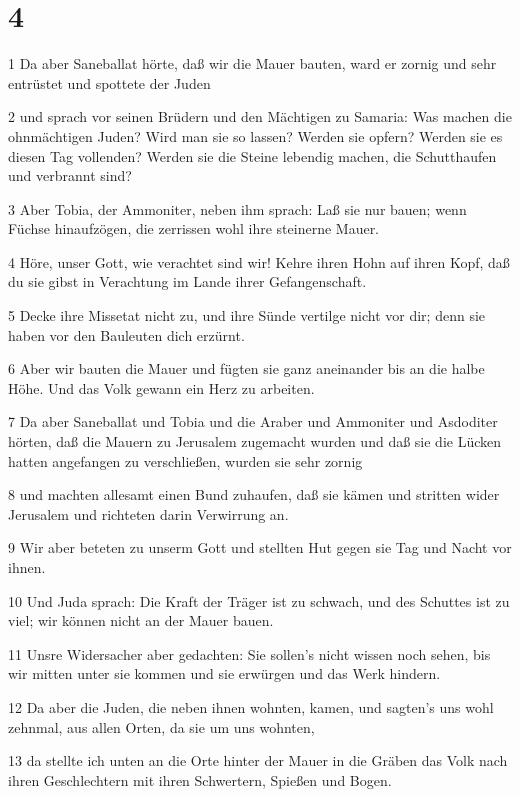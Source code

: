 \chapter{4}

\par 1 Da aber Saneballat hörte, daß wir die Mauer bauten, ward er zornig und sehr entrüstet und spottete der Juden
\par 2 und sprach vor seinen Brüdern und den Mächtigen zu Samaria: Was machen die ohnmächtigen Juden? Wird man sie so lassen? Werden sie opfern? Werden sie es diesen Tag vollenden? Werden sie die Steine lebendig machen, die Schutthaufen und verbrannt sind?
\par 3 Aber Tobia, der Ammoniter, neben ihm sprach: Laß sie nur bauen; wenn Füchse hinaufzögen, die zerrissen wohl ihre steinerne Mauer.
\par 4 Höre, unser Gott, wie verachtet sind wir! Kehre ihren Hohn auf ihren Kopf, daß du sie gibst in Verachtung im Lande ihrer Gefangenschaft.
\par 5 Decke ihre Missetat nicht zu, und ihre Sünde vertilge nicht vor dir; denn sie haben vor den Bauleuten dich erzürnt.
\par 6 Aber wir bauten die Mauer und fügten sie ganz aneinander bis an die halbe Höhe. Und das Volk gewann ein Herz zu arbeiten.
\par 7 Da aber Saneballat und Tobia und die Araber und Ammoniter und Asdoditer hörten, daß die Mauern zu Jerusalem zugemacht wurden und daß sie die Lücken hatten angefangen zu verschließen, wurden sie sehr zornig
\par 8 und machten allesamt einen Bund zuhaufen, daß sie kämen und stritten wider Jerusalem und richteten darin Verwirrung an.
\par 9 Wir aber beteten zu unserm Gott und stellten Hut gegen sie Tag und Nacht vor ihnen.
\par 10 Und Juda sprach: Die Kraft der Träger ist zu schwach, und des Schuttes ist zu viel; wir können nicht an der Mauer bauen.
\par 11 Unsre Widersacher aber gedachten: Sie sollen's nicht wissen noch sehen, bis wir mitten unter sie kommen und sie erwürgen und das Werk hindern.
\par 12 Da aber die Juden, die neben ihnen wohnten, kamen, und sagten's uns wohl zehnmal, aus allen Orten, da sie um uns wohnten,
\par 13 da stellte ich unten an die Orte hinter der Mauer in die Gräben das Volk nach ihren Geschlechtern mit ihren Schwertern, Spießen und Bogen.
